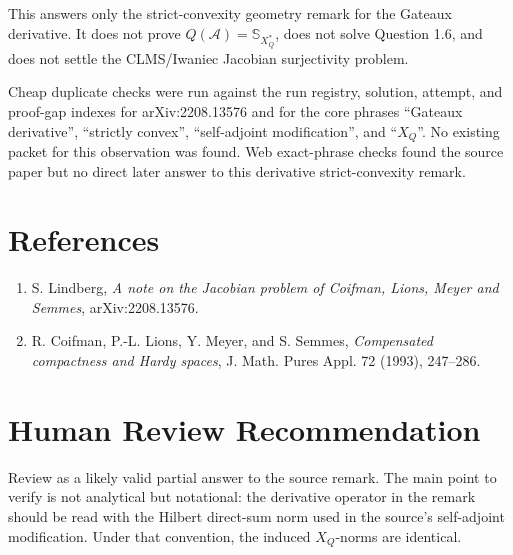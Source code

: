 \documentclass[11pt]{article}
\newcommand{\Sph}{\mathbb S}
\newcommand{\A}{\mathcal A}
\begin{document}
This answers only the strict-convexity geometry remark for the Gateaux
derivative.  It does not prove \(Q(\A)=\Sph_{X_Q^*}\), does not solve
Question 1.6, and does not settle the CLMS/Iwaniec Jacobian surjectivity
problem.

Cheap duplicate checks were run against the run registry, solution, attempt,
and proof-gap indexes for arXiv:2208.13576 and for the core phrases
``Gateaux derivative'', ``strictly convex'', ``self-adjoint modification'',
and ``\(X_Q\)''.  No existing packet for this observation was found.  Web
exact-phrase checks found the source paper but no direct later answer to this
derivative strict-convexity remark.

\section*{References}

\begin{enumerate}
\item S. Lindberg, \emph{A note on the Jacobian problem of Coifman, Lions,
Meyer and Semmes}, arXiv:2208.13576.
\item R. Coifman, P.-L. Lions, Y. Meyer, and S. Semmes, \emph{Compensated
compactness and Hardy spaces}, J. Math. Pures Appl. 72 (1993), 247--286.
\end{enumerate}

\section*{Human Review Recommendation}

Review as a likely valid partial answer to the source remark.  The main point
to verify is not analytical but notational: the derivative operator in the
remark should be read with the Hilbert direct-sum norm used in the source's
self-adjoint modification.  Under that convention, the induced \(X_Q\)-norms
are identical.
\end{document}
